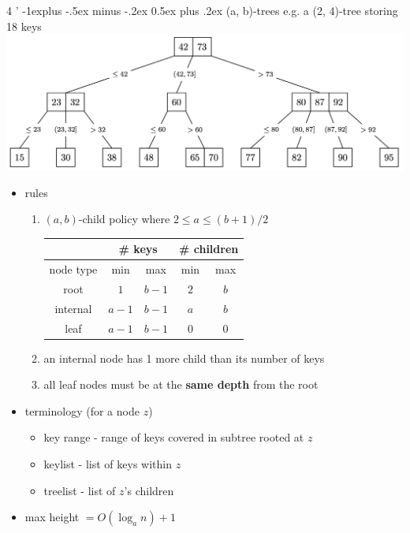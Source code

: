 \documentclass[10pt, landscape]{article}
\makeatletter
\renewcommand{\subsection}{\@startsection{subsection}{2}{0mm}%
                                {-1explus -.5ex minus -.2ex}%
                                {0.5ex plus .2ex}%
                                {\normalfont\normalsize\bfseries}}
\makeatother
\begin{document}
\begin{multicols}{4
    '}
\subsection{(a, b)-trees}
{\scriptsize{e.g. a (2, 4)-tree storing 18 keys}}
\includegraphics[width=1\linewidth]{cs2040s-ab-tree.png}
\begin{itemize}
    \item rules
    \begin{enumerate}
        \item $(a, b)$-child policy where $2 \leq a \leq (b+1)/2$
        \begin{tabular}{|c|c|c|c|c|}
            \hline 
             & \multicolumn{2}{c|}{\# keys} & \multicolumn{2}{c|}{\# children}
            \\\hline
            node type & min & max & min & max
            \\\hline
            root & $1$ & $b-1$ & $2$ & $b$
            \\\hline
            internal & $a-1$ & $b-1$ & $a$ & $b$
            \\\hline
            leaf & $a-1$ & $b-1$ & $0$ & $0$
            \\\hline
        \end{tabular}
        \item an internal node has 1 more child than its number of keys
        \item all leaf nodes must be at the \textbf{same depth} from the root
    \end{enumerate}
    \item terminology (for a node $z$)
    \begin{itemize}
        \item key range - range of keys covered in subtree rooted at $z$
        \item keylist - list of keys within $z$
        \item treelist - list of $z$'s children
    \end{itemize}
    \item max height $= O(\log_an) + 1$

\end{itemize}
\end{multicols}
\end{document}
